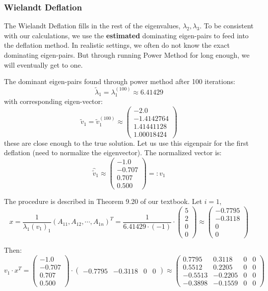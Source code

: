 \documentclass[12pt]{article} %
\newcommand{\1}[1]{\mathds{1}\left[#1\right]}
\begin{document}
\subsubsection{Wielandt Deflation}
The Wielandt Deflation fills in the rest of the eigenvalues, $\lambda_2, \lambda_3$. To be consistent with our calculations, we use the {\bf{estimated}} dominating eigen-pairs to feed into the deflation method. In realistic settings, we often do not know the exact dominating eigen-pairs. But through running Power Method for long enough, we will eventually get to one. 

The dominant eigen-pairs found through power method after 100 iterations:
$$
	\tilde{\lambda}_1 = \lambda_1^{(100)} \approx 
	6.41429
$$ with corresponding eigen-vector:
$$
	\tilde{v}_1= \tilde{v}_1^{(100)} \approx 
	\begin{pmatrix}
		-2.0\\ -1.4142764\\1.41441128\\1.00018424
	\end{pmatrix}
$$ these are close enough to the true solution. Let us use this eigenpair for the first deflation (need to normalize the eigenvector). The normalized vector is:
$$
	\widehat{\tilde{v}}_1 \approx
	\begin{pmatrix}-1.0\\ -0.707\\  0.707\\ 0.500\end{pmatrix} =: v_1
$$


The procedure is described in Theorem 9.20 of our textbook. Let $i=1$,
$$
	x = \frac{1}{\lambda_1(v_1)_1}(A_{11}, A_{12}, \cdots, A_{1n})^T = \frac{1}{6.41429\cdot (-1)}\cdot \begin{pmatrix}
	5\\
	2\\
	0\\
	0
	\end{pmatrix} \approx 
	\begin{pmatrix}
	-0.7795\\ -0.3118\\  0\\  0      
	\end{pmatrix}
$$

Then:
$$
	v_1\cdot x^T = \begin{pmatrix}
		-1.0\\ -0.707\\  0.707\\ 0.500
	\end{pmatrix}\cdot
	\begin{pmatrix}
	-0.7795 & -0.3118 &  0 &  0      
	\end{pmatrix}\approx
	\begin{pmatrix}
		0.7795 &  0.3118 &  0   &   0\\   
		0.5512&  0.2205&  0&   0\\
		-0.5513& -0.2205&  0 &  0\\
		-0.3898& -0.1559& 0 &  0    
	\end{pmatrix}
$$
\end{document}
